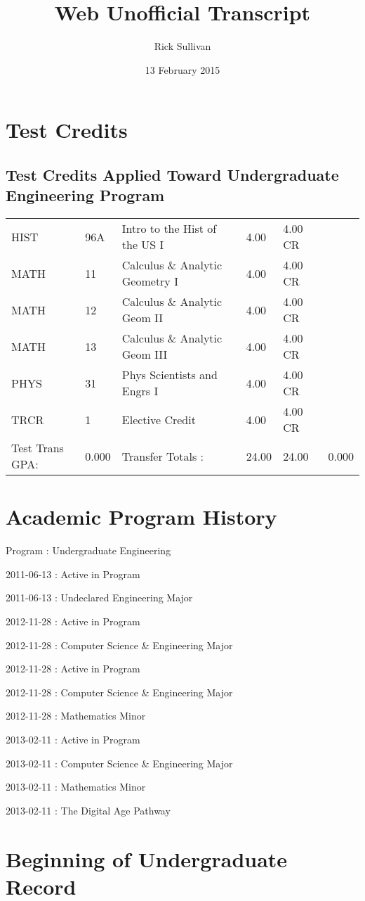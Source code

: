 \documentclass{article}\usepackage[T1]{fontenc}
\title{Web Unofficial Transcript}
\author{Rick Sullivan}
\date{13 February 2015}
\begin{document}
\maketitle

\section{Test Credits}
\subsection{Test Credits Applied Toward Undergraduate Engineering Program}
\begin{tabu}{ l  l  l  l  l  l }
HIST&96A&Intro to the Hist of the US I&4.00&4.00 CR&\\
MATH&11&Calculus \& Analytic Geometry I&4.00&4.00 CR&\\
MATH&12&Calculus \& Analytic Geom II&4.00&4.00 CR&\\
MATH&13&Calculus \& Analytic Geom III&4.00&4.00 CR&\\
PHYS&31&Phys Scientists and Engrs I&4.00&4.00 CR&\\
TRCR&1&Elective Credit&4.00&4.00 CR&\\
Test Trans GPA:&0.000&Transfer Totals :&24.00&24.00&0.000\\\end{tabu}
\section{Academic Program History}
Program	:	Undergraduate Engineering \

2011-06-13	:	Active in Program \

2011-06-13 : Undeclared Engineering Major \

2012-11-28	:	Active in Program \

2012-11-28 : Computer Science \& Engineering Major \

2012-11-28	:	Active in Program \

2012-11-28 : Computer Science \& Engineering Major \

2012-11-28 : Mathematics Minor \

2013-02-11	:	Active in Program \

2013-02-11 : Computer Science \& Engineering Major \

2013-02-11 : Mathematics Minor \

2013-02-11 : The Digital Age Pathway \

\section{Beginning of Undergraduate Record}
\end{document}
